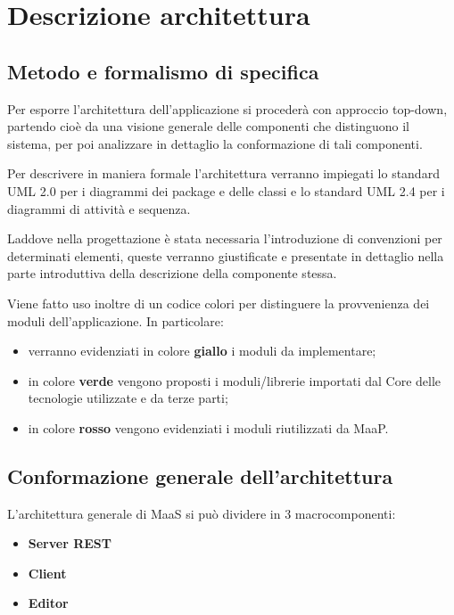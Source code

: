 \newpage
\section{Descrizione architettura}
\subsection{Metodo e formalismo di specifica}

Per esporre l'architettura dell'applicazione si procederà con approccio top-down, partendo cioè da una visione generale delle componenti che distinguono il sistema, per poi analizzare in dettaglio la conformazione di tali componenti. 

Per descrivere in maniera formale l'architettura verranno impiegati lo standard UML 2.0 per i diagrammi dei package e delle classi e lo standard UML 2.4 per i diagrammi di attività e sequenza.

Laddove nella progettazione è stata necessaria l'introduzione di convenzioni per determinati elementi, queste verranno giustificate e presentate in dettaglio nella parte introduttiva della descrizione della componente stessa.



Viene fatto uso inoltre di un codice colori per distinguere la provvenienza dei moduli dell'applicazione. In particolare:

\begin{itemize}
\item verranno evidenziati in colore \textbf{giallo} i moduli da implementare;
\item in colore \textbf{verde} vengono proposti i moduli/librerie importati dal Core delle tecnologie utilizzate e da terze parti;
\item in colore \textbf{rosso} vengono evidenziati i moduli riutilizzati da MaaP.
\end{itemize}

\subsection{Conformazione generale dell'architettura}
L'architettura generale di MaaS si può dividere in 3 macrocomponenti:
\begin{itemize}
\item \textbf{Server REST} 
\item \textbf{Client} 
\item \textbf{Editor}
\end{itemize}

